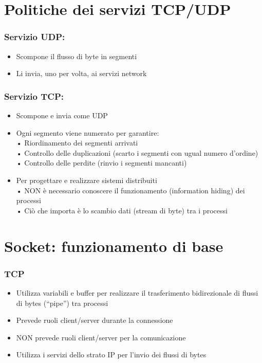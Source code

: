 \section{Politiche dei servizi TCP/UDP}
\subsubsection{Servizio UDP:}
\begin{itemize}
    \item Scompone il flusso di byte in segmenti
    \item Li invia, uno per volta, ai servizi network
\end{itemize}
\subsubsection{Servizio TCP:}
\begin{itemize}
    \item Scompone e invia come UDP
    \item Ogni segmento viene numerato per garantire:
    \\• Riordinamento dei segmenti arrivati
    \\• Controllo delle duplicazioni (scarto i segmenti con ugual numero d'ordine)
    \\• Controllo delle perdite (rinvio i segmenti mancanti)
    \item Per progettare e realizzare sistemi distribuiti
    \\• NON è necessario conoscere il funzionamento (information hiding) dei processi
    \\• Ciò che importa è lo scambio dati (stream di byte) tra i processi
\end{itemize}

\section{Socket: funzionamento di base}
\subsubsection{TCP}
\begin{itemize}
    \item Utilizza variabili e buffer per realizzare il trasferimento bidirezionale di flussi di bytes (“pipe”) tra processi
    \item Prevede ruoli client/server durante la connessione
    \item NON prevede ruoli client/server per la comunicazione
    \item Utilizza i servizi dello strato IP per l'invio dei flussi di bytes
\end{itemize}
